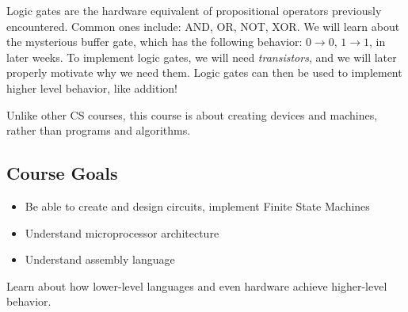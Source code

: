 Logic gates are the hardware equivalent of propositional operators previously encountered. Common ones include: AND, OR, NOT, XOR. We will learn about the mysterious buffer gate, which has the following behavior: $0 \to 0$, $1 \to 1$, in later weeks. To implement logic gates, we will need \textit{transistors}, and we will later properly motivate why we need them. Logic gates can then be used to implement higher level behavior, like addition!

Unlike other CS courses, this course is about creating devices and machines, rather than programs and algorithms.

\subsection{Course Goals}

\begin{itemize}
\item Be able to create and design circuits, implement Finite State Machines
\item Understand microprocessor architecture
\item Understand assembly language
\end{itemize}

Learn about how lower-level languages and even hardware achieve higher-level behavior.

